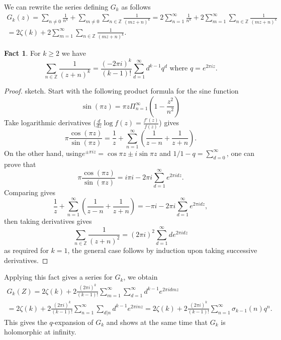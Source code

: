\documentclass{article}
\theoremstyle{definition}
\newtheorem*{fact}{Fact}
\begin{document}
We can rewrite the series defining $G_k$ as follows
\begin{multline*}
G_k(z) = \sum_{n\ne 0}\frac{1}{n^k} + \sum_{m\ne 0}\sum_{n\in\mathbb{Z}}\frac{1}{(mz+n)^k} = 2\sum_{n=1}^{\infty}\frac{1}{n^k} + 2 \sum_{m=1}^{\infty}\sum_{n\in\mathbb{Z}}\frac{1}{(mz+n)^k} \\
= 2\zeta(k) + 2\sum_{m=1}^{\infty}\sum_{n\in\mathbb{Z}}\frac{1}{(mz+n)^k}.\end{multline*}

\begin{fact}
For $k\ge 2$ we have
\[\sum_{n\in\mathbb{Z}}\frac{1}{(z+n)^k} = \frac{(-2\pi i)^k}{(k-1)!}\sum_{d=1}^{\infty}d^{k-1}q^d\text{ where } q= e^{2\pi i z}.\]
\end{fact}

\begin{proof} sketch.
Start with the following product formula for the sine function
\[\sin(\pi z) = \pi z\Pi_{n=1}^{\infty}\left(1-\frac{z^2}{n^2}\right)\]
Take logarithmic derivatives ($\frac{d}{dz}\log f(z) = \frac{f'(z)}{f(z)}$) gives
\[\pi \frac{\cos(\pi z)}{\sin(\pi z)} = \frac{1}{z} + \sum_{n=1}^{\infty}\left(\frac{1}{z-n}+ \frac{1}{z+n}\right).\]
On the other hand, using$e^{\pm \pi i z} = \cos\pi z\pm i\sin \pi z$ and $1/1-q = \sum_{d=0}^{\infty}$, one can prove that 
\[\pi\frac{\cos(\pi z)}{\sin(\pi z)} = i\pi i - 2\pi i \sum_{d=1}^{\infty}e^{2 \pi i dz}.\]
Comparing gives
\[\frac{1}{z} + \sum_{n=1}^{\infty}\left(\frac{1}{z-n} + \frac{1}{z+n}\right) = -\pi i -2\pi i\sum_{d=1}^{\infty}e^{2\pi i d z},\]
then taking derivatives gives
\[\sum_{n\in\mathbb{Z}} \frac{1}{(z+n)^2} = (2\pi i)^2\sum_{d=1}^{\infty}de^{2\pi i dz}\]
as required for $k=1$, the general case follows by induction upon taking successive derivatives.
\end{proof}

Applying this fact gives a series for $G_k$, we obtain
\begin{multline*}
G_k(Z) = 2\zeta(k) + 2\frac{(2\pi i)^k}{(k-1)!}\sum_{m=1}^{\infty}\sum_{d=1}^{\infty}d^{k-1}e^{2 \pi i d m z} \\
= 2\zeta(k) + 2\frac{(2\pi i)^k}{(k-1)!}\sum_{n=1}^\infty\sum_{d|n}d^{k-1}e^{2\pi i n z} =2\zeta(k) + 2\frac{(2\pi i)^k}{(k-1)!}\sum_{n=1}^\infty \sigma_{k-1}(n)q^n.\end{multline*}
This gives the $q$-expansion of $G_k$ and shows at the same time that $G_k$ is holomorphic at infinity.
\end{document}
